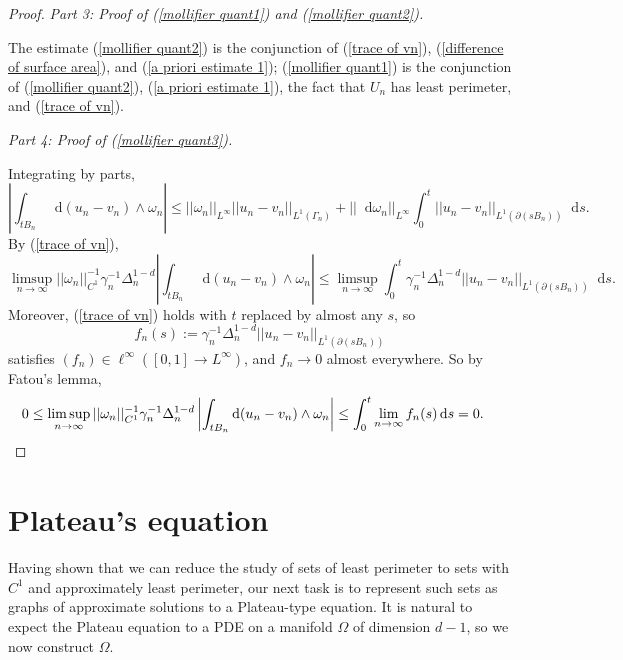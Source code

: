 \documentclass[reqno,12pt,letterpaper]{amsart}
\newcommand*\dif{\mathop{}\!\mathrm{d}}
\theoremstyle{definition}
\newcommand{\proofpart}[2]{%
  \par
  \addvspace{\medskipamount}%
  \noindent\emph{Part #1: #2.}
}
\numberwithin{equation}{section}
\begin{document}
\begin{proof}
\proofpart{3}{Proof of (\ref{mollifier quant1}) and (\ref{mollifier quant2})}
The estimate (\ref{mollifier quant2}) is the conjunction of (\ref{trace of vn}), (\ref{difference of surface area}), and (\ref{a priori estimate 1});
(\ref{mollifier quant1}) is the conjunction of (\ref{mollifier quant2}), (\ref{a priori estimate 1}), the fact that $U_n$ has least perimeter, and (\ref{trace of vn}).

\proofpart{4}{Proof of (\ref{mollifier quant3})}
Integrating by parts,
$$\left|\int_{tB_n} \dif (u_n - v_n) \wedge \omega_n\right| \leq ||\omega_n||_{L^\infty} ||u_n - v_n||_{L^1(\Gamma_n)} + ||\dif \omega_n||_{L^\infty} \int_0^t ||u_n - v_n||_{L^1(\partial(sB_n))} \dif s.$$
By (\ref{trace of vn}),
$$\limsup_{n \to \infty} ||\omega_n||_{C^1}^{-1} \gamma_n^{-1} \Delta_n^{1 - d} \left|\int_{tB_n} \dif(u_n - v_n) \wedge \omega_n\right| \leq \limsup_{n \to \infty} \int_0^t \gamma_n^{-1} \Delta_n^{1 - d} ||u_n - v_n||_{L^1(\partial(sB_n))} \dif s.$$
Moreover, (\ref{trace of vn}) holds with $t$ replaced by almost any $s$, so
$$f_n(s) := \gamma_n^{-1} \Delta_n^{1 - d} ||u_n - v_n||_{L^1(\partial(sB_n))}$$
satisfies $(f_n) \in \ell^\infty([0, 1] \to L^\infty)$, and $f_n \to 0$ almost everywhere.
So by Fatou's lemma,
\begin{align*}
0 \leq \limsup_{n \to \infty} ||\omega_n||_{C^1}^{-1} \gamma_n^{-1} \Delta_n^{1 - d} \left|\int_{tB_n} \dif(u_n - v_n) \wedge \omega_n\right| &\leq \int_0^t \lim_{n \to \infty} f_n(s) \dif s = 0. \qedhere
\end{align*}
\end{proof}




\section{Plateau's equation}\label{Plateau section}
Having shown that we can reduce the study of sets of least perimeter to sets with $C^1$ and approximately least perimeter, our next task is to represent such sets as graphs of approximate solutions to a Plateau-type equation.
It is natural to expect the Plateau equation to a PDE on a manifold $\Omega$ of dimension $d - 1$, so we now construct $\Omega$.
\end{document}
